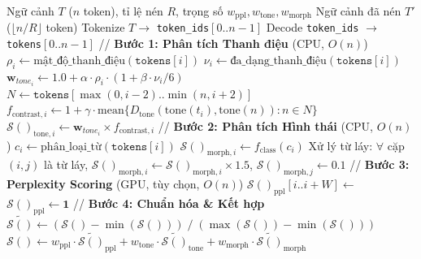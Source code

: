 \documentclass[12pt,a4paper]{article}
\newcommand{\score}[1]{\mathcal{S}(#1)}      %
\newcommand{\weight}[1]{\mathbf{w}_{#1}}     %
\newcommand{\method}[1]{\textsc{#1}}         %
\begin{document}
\begin{algorithm}[H]
\caption{\method{LACC}: Language-Aware Context Compression}
\label{alg:lacc}
\begin{algorithmic}[1]
\Require Ngữ cảnh $T$ ($n$ token), tỉ lệ nén $R$, trọng số $w_{\text{ppl}}, w_{\text{tone}}, w_{\text{morph}}$
\Ensure Ngữ cảnh đã nén $T'$ ($\lfloor n/R \rfloor$ token)
\State Tokenize $T \to$ \texttt{token\_ids}$[0..n-1]$
\State Decode \texttt{token\_ids} $\to$ \texttt{tokens}$[0..n-1]$ 
\State
\State // \textbf{Bước 1: Phân tích Thanh điệu} (CPU, $O(n)$)
    \State $\rho_i \gets \text{mật\_độ\_thanh\_điệu}(\texttt{tokens}[i])$
    \State $\nu_i \gets \text{đa\_dạng\_thanh\_điệu}(\texttt{tokens}[i])$
    \State $\weight{tone}_i \gets 1.0 + \alpha \cdot \rho_i \cdot (1 + \beta \cdot \nu_i / 6)$
    \State $N \gets \texttt{tokens}[\max(0,i-2)..\min(n,i+2)]$ 
    \State $f_{\text{contrast},i} \gets 1 + \gamma \cdot \text{mean}\{D_{\text{tone}}(\text{tone}(t_i), \text{tone}(n)) : n \in N\}$
    \State $\score{}_{\text{tone},i} \gets \weight{tone}_i \times f_{\text{contrast},i}$
\EndFor
\State
\State // \textbf{Bước 2: Phân tích Hình thái} (CPU, $O(n)$)
    \State $c_i \gets \text{phân\_loại\_từ}(\texttt{tokens}[i])$ 
    \State $\score{}_{\text{morph},i} \gets f_{\text{class}}(c_i)$ 
\EndFor
\State Xử lý từ láy: $\forall$ cặp $(i,j)$ là từ láy, $\score{}_{\text{morph},i} \gets \score{}_{\text{morph},i} \times 1.5$, $\score{}_{\text{morph},j} \gets 0.1$
\State
\State // \textbf{Bước 3: Perplexity Scoring} (GPU, tùy chọn, $O(n)$)
     
        \State $\score{}_{\text{ppl}}[i..i{+}W] \gets$  
    \EndFor
\Else
    \State $\score{}_{\text{ppl}} \gets \mathbf{1}$ 
\EndIf
\State
\State // \textbf{Bước 4: Chuẩn hóa \& Kết hợp}
\For{mỗi $\score{} \in \{\score{}_{\text{ppl}}, \score{}_{\text{tone}}, \score{}_{\text{morph}}\}$}
    \State $\tilde{\score{}} \gets (\score{} - \min(\score{})) \;/\; (\max(\score{}) - \min(\score{}))$ \Comment{$\to [0,1]$}
\EndFor
\State $\score{} \gets w_{\text{ppl}} \cdot \tilde{\score{}}_{\text{ppl}} + w_{\text{tone}} \cdot \tilde{\score{}}_{\text{tone}} + w_{\text{morph}} \cdot \tilde{\score{}}_{\text{morph}}$ 

\end{algorithmic}
\end{algorithm}
\end{document}
